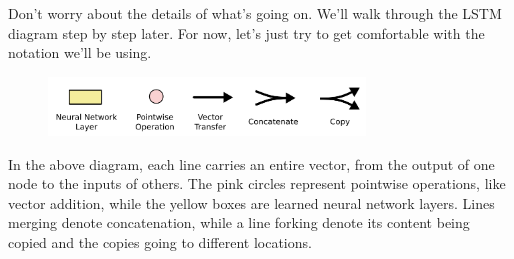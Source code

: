 Don’t worry about the details of what’s going on. We’ll walk through the LSTM diagram step by step later. For now, let’s just try to get comfortable with the notation we’ll be using.

\begin{figure}[htbp]
	\centering
	\includegraphics[width=0.75\textwidth]{fig/6.png}
\end{figure}

In the above diagram, each line carries an entire vector, from the output of one node to the inputs of others. The pink circles represent pointwise operations, like vector addition, while the yellow boxes are learned neural network layers. Lines merging denote concatenation, while a line forking denote its content being copied and the copies going to different locations.

